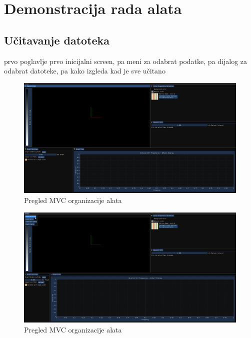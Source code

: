 \documentclass[times, utf8, diplomski]{fer}
\begin{document}
\chapter{Demonstracija rada alata}

\section{Učitavanje datoteka}
prvo poglavlje
prvo inicijalni screen, pa meni za odabrat podatke, pa dijalog za odabrat datoteke, pa kako izgleda kad je sve učitano

\begin{figure} [H]
	\centering
    \includegraphics[width=\textwidth]{demonstration/initial_screenshot.png}
    \caption{Pregled MVC organizacije alata}
    \label{fig:high-level-overview}
\end{figure}

\begin{figure} [H]
	\centering
    \includegraphics[width=\textwidth]{demonstration/load_file_menu.png}
    \caption{Pregled MVC organizacije alata}
    \label{fig:high-level-overview}
\end{figure}
\end{document}

